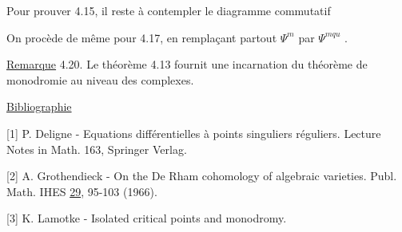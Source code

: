 Pour prouver 4.15, il reste à contempler le diagramme commutatif

\begin{center}
\end{center}
On procède de même pour 4.17, en remplaçant partout $\Psi^m$ par $\Psi^{mqu}$ .

\underline{Remarque} 4.20. Le théorème 4.13 fournit une incarnation du théorème de monodromie au niveau des complexes.




\underline{Bibliographie}

[1] \hspace{2em} P. Deligne - Equations différentielles à points singuliers réguliers. Lecture Notes in Math. 163, Springer Verlag.

[2] \hspace{2em} A. Grothendieck - On the De Rham cohomology of algebraic varieties. Publ. Math. IHES \underline{29}, 95-103 (1966).

[3] \hspace{2em} K. Lamotke - Isolated critical points and monodromy.
